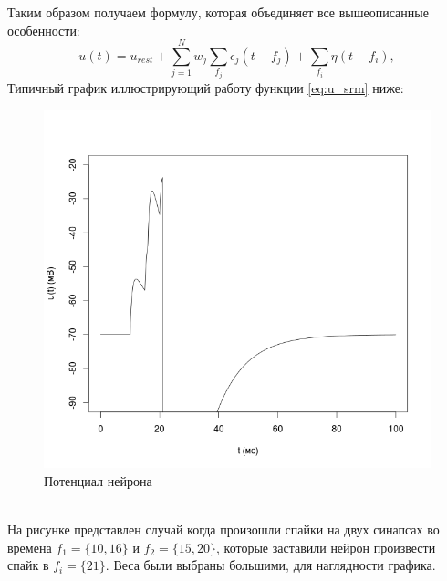 \documentclass[a4paper,10pt]{article}
\begin{document}
\indent Таким образом получаем формулу, которая объединяет все вышеописанные особенности:
\begin{equation}\label{eq:u_srm}
u(t) = u_{rest} + \sum_{j=1}^N w_{j} \sum_{f_{j}} \epsilon_{j}(t-f_{j}) + \sum_{f_{i}}\eta(t-f_{i}),
\end{equation}
Типичный график иллюстрирующий работу функции \ref{eq:u_srm} ниже: 
\begin{figure}[ht]\label{pic:u_srm}
\centering
\includegraphics[width=1\linewidth]{u_srm}
\caption{Потенциал нейрона}
\end{figure} \\
\indent На рисунке представлен случай когда произошли спайки на двух синапсах во времена $f_{1} = \{10, 16\}$ и $f_{2}=\{15,20\}$, которые заставили нейрон произвести спайк в $f_{i} = \{21\}$. Веса были выбраны большими, для наглядности графика.
\end{document}
